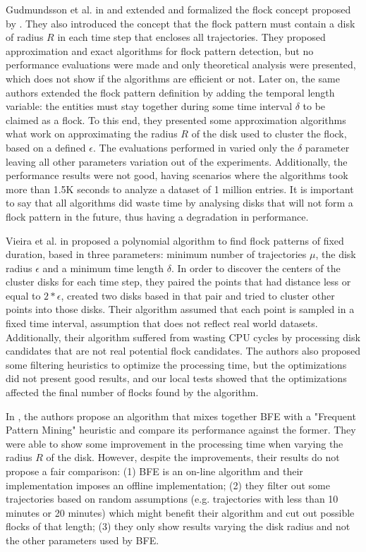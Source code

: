 Gudmundsson et al. in \citep{gudefficient} and \citep{gudlongest} extended and formalized the flock concept
proposed by \citep{remo}. They also introduced the concept that the flock pattern must contain a disk of radius $R$
in each time step that encloses all trajectories. They proposed approximation and exact algorithms for flock pattern
detection, but no performance evaluations were made and only theoretical analysis were presented, which does not show if
the algorithms are efficient or not. Later on, the same authors \citep{gudlongest} extended the flock pattern
definition by adding the temporal length variable: the entities must stay together during some time interval $\delta$ to
be claimed as a flock. To this end, they presented some approximation algorithms what work on approximating the radius
$R$ of the disk used to cluster the flock, based on a defined $\epsilon$. The evaluations performed in
\citep{gudlongest} varied only the $\delta$ parameter leaving all other parameters variation out of the
experiments. Additionally, the performance results were not good, having scenarios where the algorithms took more than
1.5K seconds to analyze a dataset of 1 million entries. It is important to say that all algorithms did waste time by
analysing disks that will not form a flock pattern in the future, thus having a degradation in performance.

Vieira et al. in \citep{vieira} proposed a polynomial algorithm to find flock patterns of fixed duration, based in
three parameters: minimum number of trajectories $\mu$, the disk radius $\epsilon$ and a minimum time length $\delta$.
In order to discover the centers of the cluster disks for each time step, they paired the points that had distance less
or equal to $2*\epsilon$, created two disks based in that pair and tried to cluster other points into those disks. Their
algorithm assumed that each point is sampled in a fixed time interval, assumption that does not reflect real world
datasets. Additionally, their algorithm suffered from wasting CPU cycles by processing disk candidates that are not real
potential flock candidates. The authors also proposed some filtering heuristics to optimize the processing time, but the
optimizations did not present good results, and our local tests showed that the optimizations affected the final number
of flocks found by the algorithm.

In \citep{visual}, the authors propose an algorithm that mixes together BFE \citep{vieira} with a "Frequent
Pattern Mining" heuristic and compare its performance against the former. They were able to show some improvement in the
processing time when varying the radius $R$ of the disk. However, despite the improvements, their results do not propose
a fair comparison: (1) BFE is an on-line algorithm and their implementation imposes an offline implementation; (2) they
filter out some trajectories based on random assumptions (e.g. trajectories with less than 10 minutes or 20 minutes)
which might benefit their algorithm and cut out possible flocks of that length; (3) they only show results varying the
disk radius and not the other parameters used by BFE.

